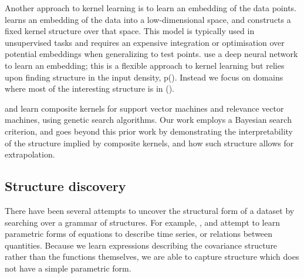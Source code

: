 Another approach to kernel learning is to learn an embedding of the data points. 
\citet{lawrence2005probabilistic} learns an embedding of the data into a low-dimensional space, and constructs a fixed kernel structure over that space.
This model is typically used in unsupervised tasks and requires an expensive integration or optimisation over potential embeddings when generalizing to test points.
\citet{salakhutdinov2008using} use a deep neural network to learn an embedding;
this is a flexible approach to kernel learning but relies upon finding structure in the input density, p().
Instead we focus on domains where most of the interesting structure is in \function().

\citet{diosan2007evolving} and \citet{bing2010gp} learn composite kernels for support vector machines and relevance vector machines, using genetic search algorithms.
Our work employs a Bayesian search criterion, and goes beyond this prior work by demonstrating the interpretability of the structure implied by composite kernels, and how such structure allows for extrapolation.


\subsection{Structure discovery}

There have been several attempts to uncover the structural form of a dataset by searching over a grammar of structures. For example, \cite{Schmidt2009b}, \cite{todorovski1997declarative} and \cite{washio1999discovering} attempt to learn parametric forms of equations to describe time series, or relations between quantities. Because we learn expressions describing the covariance structure rather than the functions themselves, we are able to capture structure which does not have a simple parametric form.

